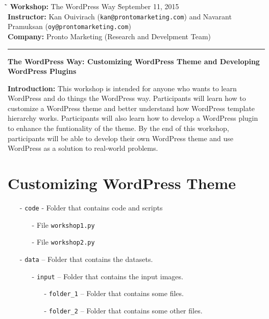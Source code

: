 \documentclass{article}
\begin{document}
\begin{tabbing}
    \`\=\kill
    \textbf{Workshop:} The WordPress Way
    \` September 11, 2015 \\
    \textbf{Instructor:} Kan Ouivirach ({\tt \small kan@prontomarketing.com})
        and Navarant Pramuksan ({\tt \small oy@prontomarketing.com}) \\
    \textbf{Company:} Pronto Marketing (Research and Develpment Team)
\end{tabbing}

\hrule

\vspace{.25in}

\begin{center}
    \textbf{\Large The WordPress Way: Customizing WordPress Theme and
        Developing WordPress Plugins}
\end{center}

\vspace{.15in}

\noindent \textbf{Introduction:} This workshop is intended for anyone who wants
    to learn WordPress and do things the WordPress way. Participants will
    learn how to customize a WordPress theme and better understand how
    WordPress template hierarchy works. Participants will also learn
    how to develop a WordPress plugin to enhance the funtionality of the theme.
    By the end of this workshop, participants will be able to develop their own
    WordPress theme and use WordPress as a solution to real-world problems.

\section*{Customizing WordPress Theme}

\begin{itemize}
    \item[-] {\tt code} - Folder that contains code and scripts
    \begin{itemize}
        \item[-] File {\tt workshop1.py}
        \item[-] File {\tt workshop2.py}
    \end{itemize}
    \item[-] {\tt data} -- Folder that contains the datasets.
    \begin{itemize}
        \item[-] {\tt input} -- Folder that contains the input images.
        \begin{itemize}
            \item[-] {\tt folder\_1} -- Folder that contains some files.
            \item[-] {\tt folder\_2} -- Folder that contains some other files.
        \end{itemize}
    \end{itemize}
\end{itemize}
\end{document}
